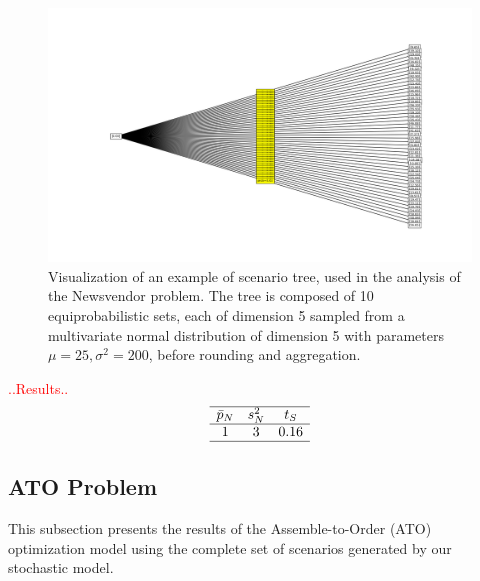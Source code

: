\documentclass[a4paper,12pt]{article}
\begin{document}
	\begin{figure}[H]
		\centering
		\includegraphics[width=1\textwidth]{../immagini/scenariNV.png}
		\caption{Visualization of an example of scenario tree, used in the analysis of the Newsvendor problem. The tree is composed of 10 equiprobabilistic sets, each of dimension 5 sampled from a multivariate normal distribution of dimension 5 with parameters $\mu = 25, \sigma^{2} = 200$, before rounding and aggregation.}
		\label{fig:scenariotree-plot}
	\end{figure}
	
	\textcolor{red}{..Results..}
	\[
	\begin{array}{ccc}
		\hline
		\text{$\bar{p}_{N}$} & \text{$s_{N}^{2}$} & \text{$t_{S}$}\\
		\hline
		1 & 3 & 0.16 \\
		\hline
	\end{array}
	\]
	
	\label{tab:nv-results-stat}
	
	
	\subsection{ATO Problem}
	
	This subsection presents the results of the Assemble-to-Order (ATO) optimization model using the complete set of scenarios generated by our stochastic model.\\
	
\end{document}

